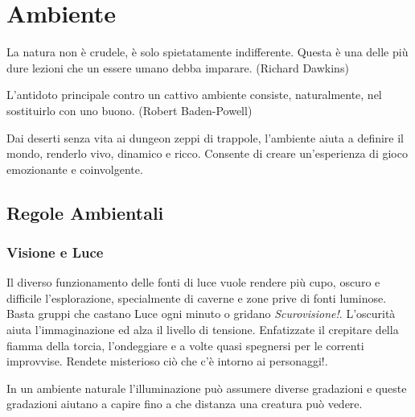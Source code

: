 \section{Ambiente}

\label{ambiente}
\begin{enfasi}{
La natura non è crudele, è solo spietatamente indifferente. Questa è una delle più dure lezioni che un essere umano debba imparare. (Richard Dawkins)

\medskip

L'antidoto principale contro un cattivo ambiente consiste, naturalmente, nel sostituirlo con uno buono. (Robert Baden-Powell)}\end{enfasi}

\begin{multicols}{2}

Dai deserti senza vita ai dungeon zeppi di trappole, l'ambiente aiuta a definire il mondo, renderlo vivo, dinamico e ricco. Consente di creare un'esperienza di gioco emozionante e coinvolgente.

\subsection{Regole Ambientali}

\label{regole-ambientali}

\subsubsection{Visione e Luce}\hypertarget{visioneeluce}{}\label{visioneeluce}

\begin{narratore}[Luce]
Il diverso funzionamento delle fonti di luce vuole rendere più cupo, oscuro e difficile l'esplorazione, specialmente di caverne e zone prive di fonti luminose. Basta gruppi che castano Luce ogni minuto o gridano \emph{Scurovisione!}. L'oscurità aiuta l'immaginazione ed alza il livello di tensione. Enfatizzate il crepitare della fiamma della torcia, l'ondeggiare e a volte quasi spegnersi per le correnti improvvise. Rendete misterioso ciò che c'è intorno ai personaggi!.
\end{narratore}

\label{sec:visione-e-luce}

In un ambiente naturale l'illuminazione può assumere diverse gradazioni e queste gradazioni aiutano a capire fino a che distanza una creatura può vedere.


\end{multicols}
